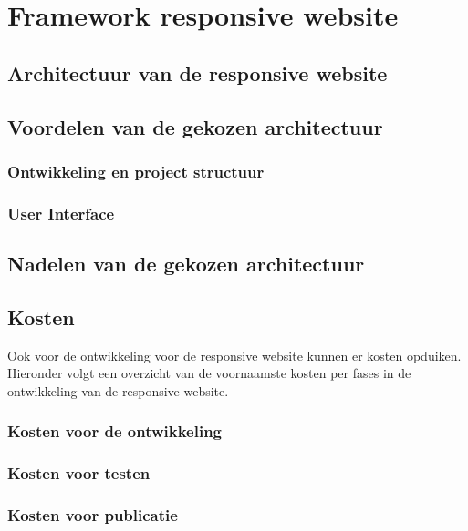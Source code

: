 \chapter{Framework responsive website}
\label{ch:frameworkresponsivewebsite}
\section{Architectuur van de responsive website}
\label{sec:voordelenvandegekozenwebarchitectuur}
\section{Voordelen van de gekozen architectuur}
\subsection{Ontwikkeling en project structuur}
\subsection{User Interface}
\label{sec:nadelenvandegekozenwebarchitectuur}
\section{Nadelen van de gekozen architectuur}

\label{sec:webkosten}
\section{Kosten}
Ook voor de ontwikkeling voor de responsive website kunnen er kosten opduiken. Hieronder volgt een overzicht van de voornaamste
kosten per fases in de ontwikkeling van de responsive website.
\subsection{Kosten voor de ontwikkeling}
\subsection{Kosten voor testen}
\subsection{Kosten voor publicatie}

